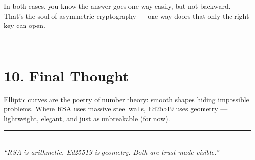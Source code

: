\documentclass[12pt]{article}
\begin{document}
In both cases, you know the answer goes one way easily, but not backward.
That’s the soul of asymmetric cryptography — one-way doors that only the right key can open.

---

\section*{10. Final Thought}

Elliptic curves are the poetry of number theory:  
smooth shapes hiding impossible problems.  
Where RSA uses massive steel walls, Ed25519 uses geometry —  
lightweight, elegant, and just as unbreakable (for now).

\begin{center}
    \rule{0.7\textwidth}{0.5pt}\\[0.5em]
    \textit{“RSA is arithmetic. Ed25519 is geometry. Both are trust made visible.”}
\end{center}
\end{document}
